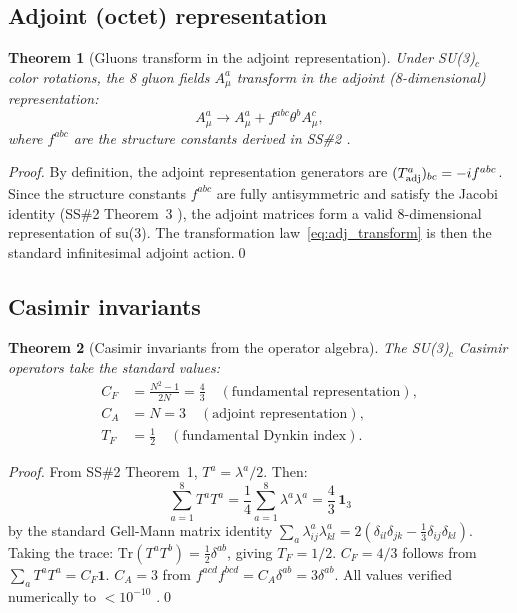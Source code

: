 \documentclass[11pt,a4paper]{article}
\newtheorem{theorem}{Theorem}[section]
\begin{document}
\subsection{Adjoint (octet) representation}

\begin{theorem}[Gluons transform in the adjoint representation]
\label{thm:adjoint}
Under SU(3)$_c$ color rotations, the 8 gluon fields $A^a_\mu$
transform in the adjoint (8-dimensional) representation:
\begin{equation}
A^a_\mu \to A^a_\mu + f^{abc}\theta^b A^c_\mu,
\label{eq:adj_transform}
\end{equation}
where $f^{abc}$ are the structure constants derived in SS\#2
\citep{cpp_ss2}.
\end{theorem}

\begin{proof}
By definition, the adjoint representation generators are
$(T^a_{\rm adj})_{bc} = -if^{abc}$.  Since the structure
constants $f^{abc}$ are fully antisymmetric and satisfy the
Jacobi identity (SS\#2 Theorem~3 \citep{cpp_ss2}), the adjoint
matrices form a valid 8-dimensional representation of su(3).
The transformation law~\eqref{eq:adj_transform} is then the
standard infinitesimal adjoint action.\qed
\end{proof}

\subsection{Casimir invariants}

\begin{theorem}[Casimir invariants from the operator algebra]
\label{thm:casimir}
The SU(3)$_c$ Casimir operators take the standard values:
\begin{align}
C_F &= \frac{N^2-1}{2N} = \frac{4}{3}
  \quad (\text{fundamental representation}),
\label{eq:CF}\\
C_A &= N = 3
  \quad (\text{adjoint representation}),
\label{eq:CA}\\
T_F &= \frac{1}{2}
  \quad (\text{fundamental Dynkin index}).
\label{eq:TF}
\end{align}
\end{theorem}

\begin{proof}
From SS\#2 Theorem~1, $T^a = \lambda^a/2$.  Then:
\[
\sum_{a=1}^8 T^a T^a
= \frac{1}{4}\sum_{a=1}^8 \lambda^a\lambda^a
= \frac{4}{3}\,\mathbf{1}_3
\]
by the standard Gell-Mann matrix identity
$\sum_a \lambda^a_{ij}\lambda^a_{kl} = 2(\delta_{il}\delta_{jk}
- \frac{1}{3}\delta_{ij}\delta_{kl})$.
Taking the trace: $\mathrm{Tr}(T^a T^b) = \frac{1}{2}\delta^{ab}$,
giving $T_F = 1/2$.  $C_F = 4/3$ follows from
$\sum_a T^a T^a = C_F \mathbf{1}$.  $C_A = 3$ from
$f^{acd}f^{bcd} = C_A \delta^{ab} = 3\delta^{ab}$.
All values verified numerically to $<10^{-10}$
\citep{cpp_ss_mc}.\qed
\end{proof}
\end{document}
